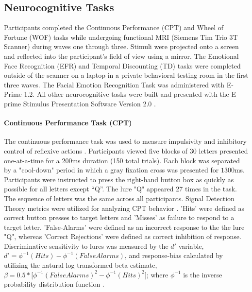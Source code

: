 \documentclass[utf8]{stylesheet}
\begin{document}
\subsection{Neurocognitive Tasks}  Participants completed the Continuous Performance (CPT) and Wheel of Fortune (WOF) tasks while undergoing functional MRI (Siemens Tim Trio 3T Scanner) during waves one through three. Stimuli were projected onto a screen and reflected into the participant's field of view using a mirror. The Emotional Face Recognition (EFR) and Temporal Discounting (TD) tasks were completed outside of the scanner on a laptop in a private behavioral testing room in the first three waves. The Facial Emotion Recognition Task was administered with E-Prime 1.2. All other neurocognitive tasks were built and presented with the E-prime Stimulus Presentation Software Version 2.0 \citep{schneider2002prime}. 
\paragraph{Continuous Performance Task (CPT)} The continuous performance task was used to measure impulsivity and inhibitory control of reflexive actions \citep{horn2003response}.  Participants viewed five blocks of $30$ letters presented one-at-a-time for a $200$ms duration (150 total trials). Each block was separated by a "cool-down" period in which a gray fixation cross was presented for $1300$ms. Participants were instructed to press the right-hand button box as quickly as possible for all letters except “Q”. The lure "Q" appeared 27 times in the task. The sequence of letters was the same across all participants.  Signal Detection Theory metrics were utilized for analyzing CPT behavior \cite{stanislaw1999calculation}. 'Hits' were defined as correct button presses to target letters and 'Misses' as failure to respond to a target letter. 'False-Alarms' were defined as an incorrect response to the the lure "Q", whereas 'Correct Rejections' were defined as correct inhibition of response. Discriminative sensitivity to lures was measured by the $d'$ variable, $d'=\phi^{-1}( Hits ) - \phi^{-1}( False Alarms )$, and response-bias calculated by utilizing the natural log-transformed beta estimate, $ \beta = 0.5*\Big[\phi^{-1}(FalseAlarms)^{2} - \phi^{-1}(Hits)^{2}\Big]$; where $\phi^{-1}$ is the inverse probability distribution function  \citep{forbes2011statistical}. 
\end{document}

